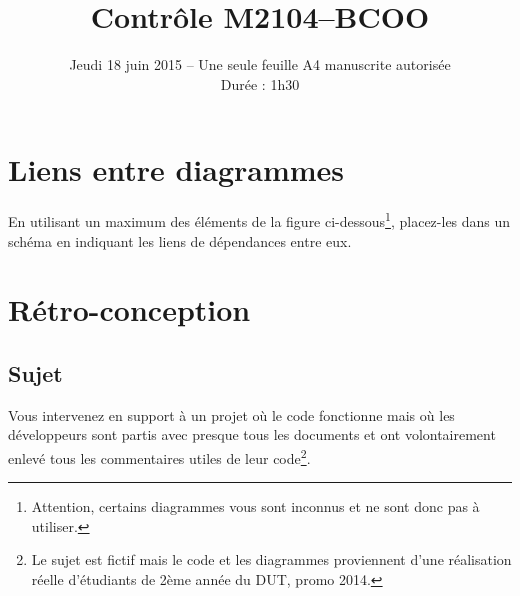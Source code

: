 \documentclass[12pt]{article}
\title{\vspace{-3pc}\textbf{Contr\^ole M2104--BCOO}}
\date{Jeudi 18 juin 2015 -- Une seule feuille A4 manuscrite autoris\'ee\\
Dur\'ee : 1h30}
\begin{document}
\maketitle

\section{Liens entre diagrammes}

En utilisant un maximum des éléments de la figure ci-dessous\footnote{Attention, certains diagrammes vous sont inconnus et ne sont donc pas à utiliser.}, placez-les dans un schéma
en indiquant les liens de dépendances entre eux.


\section{Rétro-conception}

\subsection*{Sujet}

Vous intervenez en support à un projet où le code fonctionne
mais où les développeurs sont partis avec presque tous les documents et ont volontairement enlevé tous les commentaires utiles de leur code\footnote{Le sujet est fictif mais le code et les diagrammes proviennent d'une réalisation réelle d'étudiants de 2ème année du DUT, promo 2014.}.
\end{document}
